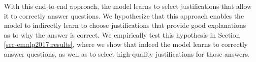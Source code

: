 
With this end-to-end approach, the model learns to select justifications that allow it to correctly answer questions.  We hypothesize that this approach enables the model to indirectly learn to choose justifications that provide good explanations as to why the answer is correct. We empirically test this hypothesis in Section \ref{sec-emnlp2017:results}, where we show that indeed the model learns to correctly answer questions, as well as to select high-quality justifications for those answers. 
